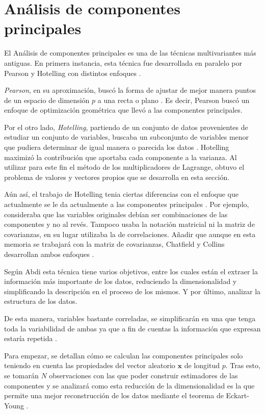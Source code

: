 \newpage
\section{Análisis de componentes principales}
\noindent El Análisis de componentes principales es una de las técnicas multivariantes más antiguas. En primera instancia, esta técnica fue desarrollada en paralelo por Pearson y Hotelling  con distintos enfoques \cite{Pearson 1901, Hotelling 1933}. 

\noindent \emph{Pearson}, en su aproximación, buscó la forma de ajustar de mejor manera puntos de un espacio de dimensión $p$ a una recta o plano \cite{Pearson 1901}. Es decir, Pearson buscó un enfoque de optimización geométrica que llevó a las componentes principales.

\noindent Por el otro lado, \emph{Hotelling}, partiendo de un conjunto de datos provenientes de estudiar un conjunto de variables,  buscaba un subconjunto de variables menor que pudiera determinar de igual manera o parecida los datos \cite{Hotelling 1933}. Hotelling maximizó la contribución que aportaba cada componente a la varianza. Al utilizar para este fin el método de los multiplicadores de Lagrange, obtuvo el problema de valores y vectores propios que se desarrolla en esta sección. 

\noindent Aún así, el trabajo de Hotelling tenia ciertas diferencias con el enfoque que actualmente se le da actualmente a las componentes principales \cite{Jollife 1986}. Por ejemplo, consideraba que las variables originales  debían ser combinaciones de las componentes y no al revés. Tampoco usaba la notación matricial ni la matriz de covarianzas, en su lugar utilizaba la de correlaciones. Añadir que aunque en esta memoria se trabajará con la matriz de covarianzas, Chatfield y Collins desarrollan ambos enfoques \cite{Chatfield 1989}. 

\noindent Según Abdi \cite{Abdi 2010} esta técnica tiene varios objetivos, entre los cuales están el extraer la información más importante de los datos, reduciendo la dimensionalidad y simplificando la descripción en el proceso de los mismos. Y por último, analizar la estructura de los datos. 


\noindent De esta manera, variables bastante correladas, se simplificarán en una que tenga toda la variabilidad de ambas  ya que a fin de cuentas la información que expresan estaría repetida \cite{Chatfield 1989, Everitt 2011}. 

\noindent Para empezar, se detallan cómo se calculan las componentes principales solo teniendo en cuenta las propiedades del vector aleatorio $\mathbf{x}$ de longitud $p$. Tras esto, se tomarán $N$ observaciones con las que poder construir estimadores de las componentes y se analizará como esta reducción de la dimensionalidad es la que permite una mejor reconstrucción de los datos mediante el teorema de Eckart-Young \cite{Eckart 1936}. 

